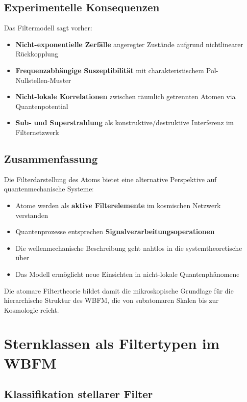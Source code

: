 \section{Experimentelle Konsequenzen}

Das Filtermodell sagt vorher:
\begin{itemize}
\item \textbf{Nicht-exponentielle Zerfälle} angeregter Zustände aufgrund nichtlinearer Rückkopplung
\item \textbf{Frequenzabhängige Suszeptibilität} mit charakteristischem Pol-Nullstellen-Muster
\item \textbf{Nicht-lokale Korrelationen} zwischen räumlich getrennten Atomen via Quantenpotential
\item \textbf{Sub- und Superstrahlung} als konstruktive/destruktive Interferenz im Filternetzwerk
\end{itemize}

\section{Zusammenfassung}

Die Filterdarstellung des Atoms bietet eine alternative Perspektive auf quantenmechanische Systeme:
\begin{itemize}
\item Atome werden als \textbf{aktive Filterelemente} im kosmischen Netzwerk verstanden
\item Quantenprozesse entsprechen \textbf{Signalverarbeitungsoperationen}
\item Die wellenmechanische Beschreibung geht nahtlos in die systemtheoretische über
\item Das Modell ermöglicht neue Einsichten in nicht-lokale Quantenphänomene
\end{itemize}

Die atomare Filtertheorie bildet damit die mikroskopische Grundlage für die hierarchische Struktur des WBFM, die von subatomaren Skalen bis zur Kosmologie reicht.

\chapter{Sternklassen als Filtertypen im WBFM}

\section{Klassifikation stellarer Filter}

